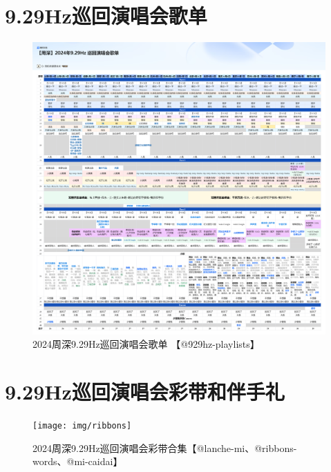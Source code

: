 \documentclass[]{ctexbook}
\begin{document}
\appendix {}


\chapter{9.29Hz巡回演唱会歌单}\label{playlists}

\begin{figure}

{\centering \includegraphics{img/playlists/playlists} 

}

\caption{2024周深9.29Hz巡回演唱会歌单 【@929hz-playlists】}\label{fig:unnamed-chunk-184}
\end{figure}

\chapter{9.29Hz巡回演唱会彩带和伴手礼}\label{appendix-gift}

\begin{figure}

{\centering \texttt{[image: img/ribbons]} 

}

\caption{2024周深9.29Hz巡回演唱会彩带合集【@lanche-mi、@ribbons-words、@mi-caidai】}\label{fig:unnamed-chunk-186}
\end{figure}
\end{document}
